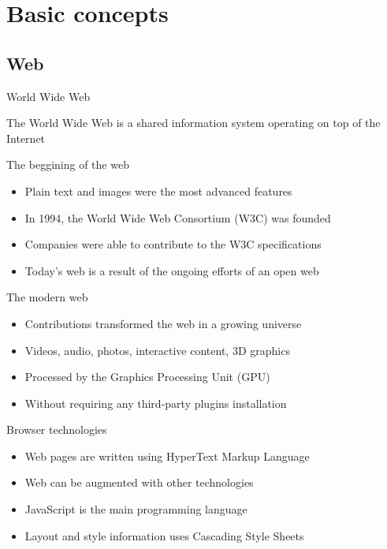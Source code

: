 \documentclass{beamer}
\begin{document}
\section{Basic concepts}

\subsection{Web}
\begin{frame}{World Wide Web}
  \begin{block}{}
      The World Wide Web is a shared information system operating on top of the Internet
  \end{block}
\end{frame}
\begin{frame}{The beggining of the web}
  \begin{itemize}
    \item Plain text and images were the most advanced features
    \item In 1994, the World Wide Web Consortium (W3C) was founded
    \item Companies were able to contribute to the W3C specifications
    \item Today's web is a result of the ongoing efforts of an open web
  \end{itemize}
\end{frame}
\begin{frame}{The modern web}
  \begin{itemize}
    \item Contributions transformed the web in a growing universe
    \item Videos, audio, photos, interactive content, 3D graphics
    \item Processed by the Graphics Processing Unit (GPU)
    \item Without requiring any third-party plugins installation
  \end{itemize}
\end{frame}
\begin{frame}{Browser technologies}
  \begin{itemize}
    \item Web pages are written using HyperText Markup Language
    \item Web can be augmented with other technologies
    \item JavaScript is the main programming language
    \item Layout and style information uses Cascading Style Sheets
  \end{itemize}
\end{frame}
\end{document}
